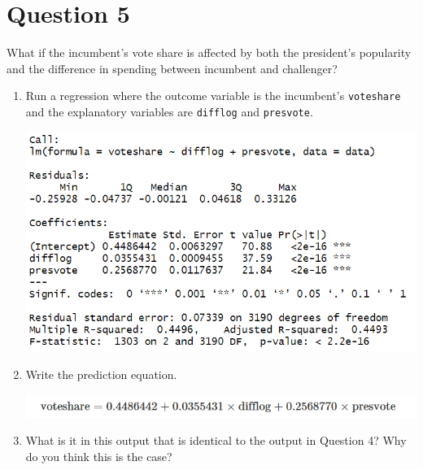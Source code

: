 \documentclass[12pt,letterpaper]{article}
\begin{document}
	\newpage	

\section*{Question 5}
\noindent What if the incumbent's vote share is affected by both the president's popularity and the difference in spending between incumbent and challenger? 
	\begin{enumerate}
		\item Run a regression where the outcome variable is the incumbent's \texttt{voteshare} and the explanatory variables are \texttt{difflog} and \texttt{presvote}.	
		 
		\includegraphics[width=0.8\linewidth]{Q15}
		\item Write the prediction equation.	
		 
		\includegraphics[width=0.8\linewidth]{Q16}
		\item What is it in this output that is identical to the output in Question 4? Why do you think this is the case?
		 
	\end{enumerate}
\end{document}
